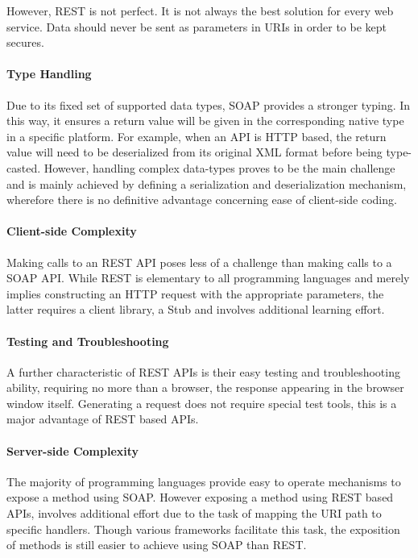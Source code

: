 However, \ac{REST} is not perfect. It is not always the best solution for every web service. Data should never be sent as parameters in \ac{URI}s in order to be kept secures. 

\paragraph{Type Handling}

Due to its fixed set of supported data types, \ac{SOAP} provides a stronger typing. In this way, it ensures a return value  will be given in the corresponding native type in a specific platform. For example, when an \ac{API} is \ac{HTTP} based, the return value will need to be deserialized from its original \ac{XML} format before being type-casted.    
However, handling complex data-types proves to be the main challenge and is mainly achieved by defining a serialization and deserialization mechanism, wherefore there is no definitive advantage concerning ease of client-side coding. 


\paragraph{Client-side Complexity}

Making calls to an \ac{REST} \ac{API} poses less of a challenge than making calls to a \ac{SOAP} \ac{API}. While \ac{REST} is elementary to all programming languages and merely implies constructing an \ac{HTTP} request with the appropriate parameters, the latter requires a client library, a Stub and involves additional learning effort.  

\paragraph{Testing and Troubleshooting}

A further characteristic of \ac{REST} \ac{API}s is their easy testing and troubleshooting ability, requiring no more than a browser, the response appearing in the browser window itself. Generating a request does not require special test tools, this is a major advantage of \ac{REST} based \ac{API}s.  
  

\paragraph{Server-side Complexity}

The majority of programming languages provide easy to operate mechanisms to expose a method using \ac{SOAP}. However exposing a method using \ac{REST} based \ac{API}s, involves additional effort due to the task of mapping the \ac{URI} path to specific handlers. Though various frameworks facilitate this task, the exposition of methods is still easier to achieve using \ac{SOAP} than \ac{REST}.

